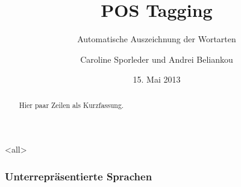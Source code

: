 
\usepackage[utf8]{inputenc}
\usepackage[T2A, T1]{fontenc}

\usepackage[russian, american, ngerman]{babel}
\usepackage{textcomp}              %
\usepackage{mathptmx}              %
\usepackage[scaled=.90]{helvet}    %
\usepackage{courier}               %
\usepackage{amsmath}               %
\usepackage{amsthm}                %

\usepackage{tabularx}

\usepackage[citestyle=authoryear]{biblatex}


\usepackage{multicol}

\usepackage{graphicx}
\graphicspath{{images/}}

\usepackage{qtree}

\usepackage{hyperref}


\mode*

\mode<all>{
  \title[POS]{POS Tagging}
  \subtitle{Automatische Auszeichnung der Wortarten}
  \author[C.\,Sporleder \& A.\,Beliankou]{Caroline
    Sporleder und Andrei Beliankou}
  \date[15.05.2013]{15. Mai 2013}
}

\maketitle

\begin{abstract}
  Hier paar Zeilen als Kurzfassung.
\end{abstract}

\tableofcontents

\begin{frame}
  \titlepage
\end{frame}

\begin{frame}
  \frametitle{Unterrepräsentierte Sprachen}

\end{frame}

